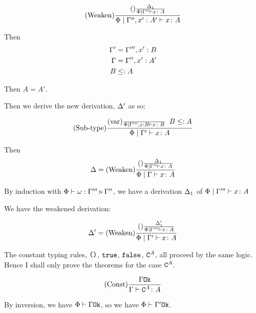 {        \begin{equation}
            (\text{Weaken}) \frac{(\text{}) \frac{\Delta_1}{\Phi\mid\Gamma'' \vdash x \colon A}}{\Phi\mid\Gamma'', x':A'  \vdash x \colon A}
        \end{equation}

        Then 
        \begin{align}
            \Gamma' & = \Gamma''', x': B\\
            \Gamma &= \Gamma'', x': A'\\
            B & \leq: A
        \end{align}


        Then $A = A'$.

        Then we derive the new derivation, $\Delta'$ as so:

        \begin{equation}
            (\text{Sub-type}) \frac{
                (\text{var}) \frac{}{\Phi\mid\Gamma''', x: B \vdash x \colon B}
                \;\;
                B \leq: A
            }{
                \Phi\mid\Gamma' \vdash x \colon A
            }
        \end{equation}

        Then 
        \begin{equation}
            \Delta = (\text{Weaken}) \frac{(\text{}) \frac{\Delta_1}{\Phi\mid\Gamma'' \vdash x \colon A}}{\Phi\mid\Gamma \vdash x \colon A}
        \end{equation}

        By induction with $\Phi\vdash \omega : \Gamma''' \triangleright \Gamma''$,
         we have a derivation $\Delta_1$ of $\Phi\mid\Gamma''' \vdash x \colon A$

        We have the weakened derivation:

        \begin{equation}
            \Delta' = (\text{Weaken}) \frac{(\text{}) \frac{\Delta_1'}{\Phi\mid\Gamma''' \vdash x \colon A}}{\Phi\mid\Gamma' \vdash x \colon A}
        \end{equation}

    The constant typing rules, $\texttt{()}$, $\texttt{true}$, $\texttt{false}$, $\texttt{C}^{A}$, all proceed by the same logic. Hence I shall only prove the theorems for the case $\texttt{C}^{A}$.

    \begin{equation}
        (\text{Const}) \frac{\Gamma \texttt{Ok}}{\Gamma \vdash \texttt{C}^{A} \colon A}
    \end{equation}

    By inversion, we have $\Phi\vdash \Gamma \texttt{Ok}$, so we have $\Phi\vdash \Gamma' \texttt{Ok}$.

}
